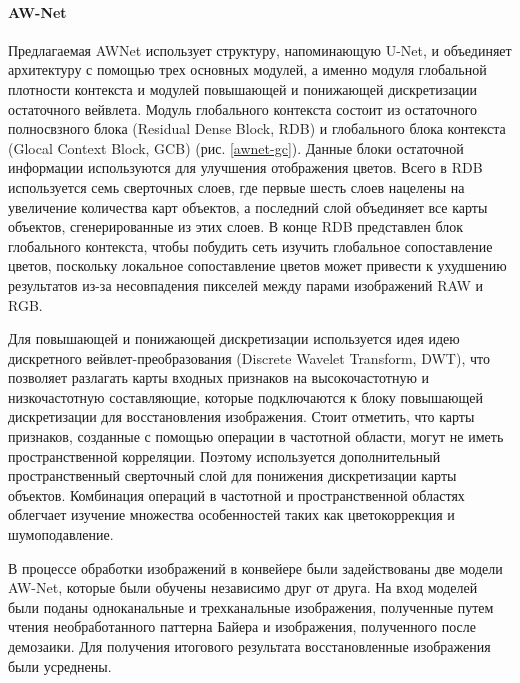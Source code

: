 \paragraph{AW-Net}


Предлагаемая AWNet использует структуру, напоминающую U-Net, и объединяет архитектуру с помощью трех основных модулей, а именно модуля глобальной плотности контекста и модулей повышающей и понижающей дискретизации остаточного вейвлета. Модуль глобального контекста состоит из остаточного полносвзного блока (Residual Dense Block, RDB) и глобального блока контекста (Glocal Context Block, GCB) (рис. \ref{awnet-gc}). Данные блоки остаточной информации используются для улучшения отображения цветов. Всего в RDB используется семь сверточных слоев, где первые шесть слоев нацелены на увеличение количества карт объектов, а последний слой объединяет все карты объектов, сгенерированные из этих слоев. В конце RDB представлен блок глобального контекста, чтобы побудить сеть изучить глобальное сопоставление цветов, поскольку локальное сопоставление цветов может привести к ухудшению результатов из-за несовпадения пикселей между парами изображений RAW и RGB. 


Для повышающей и понижающей дискретизации используется идея идею дискретного вейвлет-преобразования (Discrete Wavelet Transform, DWT), что позволяет разлагать карты входных признаков на высокочастотную и низкочастотную составляющие, которые подключаются к блоку повышающей дискретизации для восстановления изображения. Стоит отметить, что карты признаков, созданные с помощью операции в частотной области, могут не иметь пространственной корреляции. Поэтому используется дополнительный пространственный сверточный слой для понижения дискретизации карты объектов. Комбинация операций в частотной и пространственной областях облегчает изучение множества особенностей таких как цветокоррекция и шумоподавление.

В процессе обработки изображений в конвейере были задействованы две модели AW-Net, которые были обучены независимо друг от друга. На вход моделей были поданы одноканальные и трехканальные изображения, полученные путем чтения необработанного паттерна Байера и изображения, полученного после демозаики. Для получения итогового результата восстановленные изображения были усреднены.
